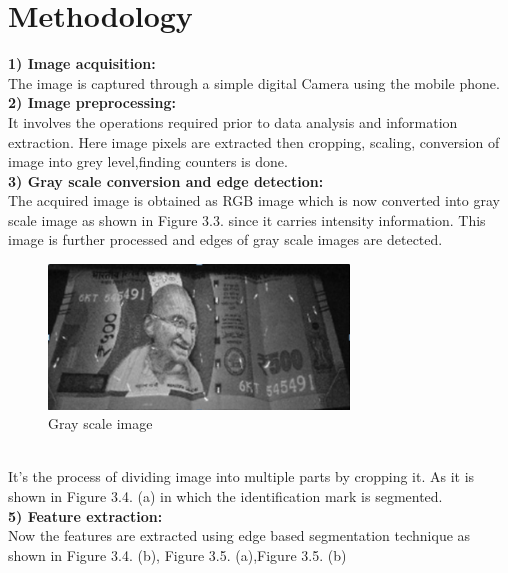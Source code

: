 \section{Methodology}
{\bf 1) Image acquisition:}\\ 
The image is captured through a simple digital Camera using the mobile phone.\\
{\bf 2) Image preprocessing:}\\ 
It involves the operations required prior to data analysis and information extraction. Here image pixels are extracted then cropping, scaling, conversion of image into grey level,finding counters is done.\\
{\bf 3) Gray scale conversion and edge detection:}\\ 
The acquired image is obtained as RGB image which is now converted into gray scale image as shown in Figure 3.3.  since it carries intensity information. This image is further processed and edges of gray scale images are detected.\\
\begin{figure}[h!]
	\centering
	\includegraphics[width=80mm]{CHAPTERS/m1.PNG}
	\caption{Gray scale image}
\end{figure}
\\
It’s the process of dividing image into multiple parts by cropping it. As it is shown in Figure 3.4. (a) in which the identification mark is segmented.\\ 
{\bf 5) Feature extraction:}\\ 
Now the features are extracted using edge based segmentation technique as shown in Figure 3.4. (b), Figure 3.5. (a),Figure 3.5. (b) \citeauthor{9020097}\\

